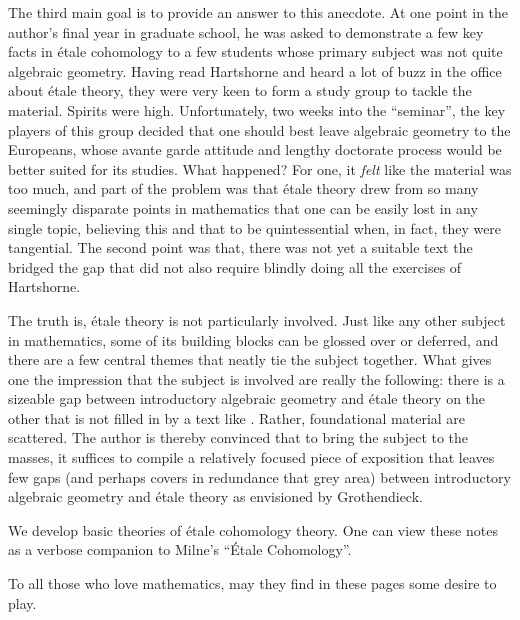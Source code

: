 The third main goal is to provide an answer to this anecdote. At 
one point in the author's final year in graduate school, he was 
asked to demonstrate a few key facts in \'etale cohomology to a 
few students whose primary subject was not quite algebraic 
geometry. Having read Hartshorne and heard a lot of buzz in the 
office about \'etale theory, they were very keen to form a study 
group to tackle the material. Spirits were high. Unfortunately,
two weeks into the ``seminar'', the key players of this group 
decided that one should best leave algebraic geometry to the 
Europeans, whose avante garde attitude and lengthy doctorate 
process would be better suited for its studies. What happened? 
For one, it \emph{felt} like the material was too much, and part 
of the problem was that \'etale theory drew from so many seemingly 
disparate points in mathematics that one can be easily lost in any 
single topic, believing this and that to be quintessential when, 
in fact, they were tangential. The second point was that, there 
was not yet a suitable text the bridged the gap that did not also 
require blindly doing all the exercises of Hartshorne.

The truth is, \'etale theory is not particularly involved. Just
like any other subject in mathematics, some of its building blocks 
can be glossed over or deferred, and there are a few central 
themes that neatly tie the subject together. What gives one the 
impression that the subject is involved are really the following: 
there is a sizeable gap between introductory algebraic geometry 
and \'etale theory on the other that is not filled in by a text 
like \cite{Milne}. Rather, foundational material are scattered. 
The author is thereby convinced that to bring the subject to the 
masses, it suffices to compile a relatively focused piece of 
exposition that leaves few gaps (and perhaps covers in redundance 
that grey area) between introductory algebraic geometry and 
\'etale theory as envisioned by Grothendieck.

We develop basic theories of \'etale cohomology theory. One can
view these notes as a verbose companion to Milne's ``\'Etale
Cohomology''.

To all those who love mathematics, may they find in these pages 
some desire to play.
